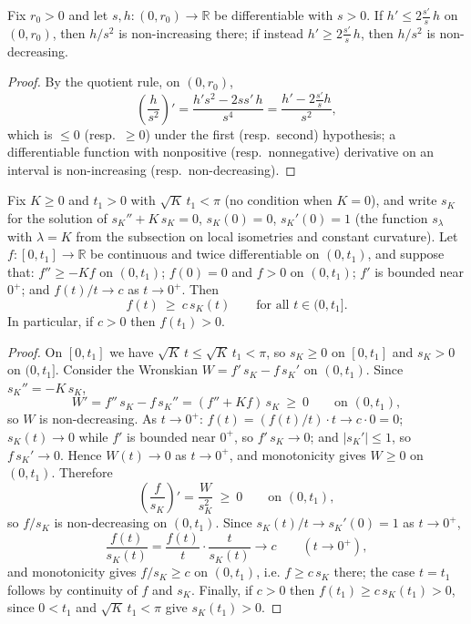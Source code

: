 \begin{lemma}
\label{lem:ratio-monotone}




Fix $r_0>0$ and let $s,h\colon(0,r_0)\to\mathbb R$ be differentiable
with $s>0$. If $h'\le 2\frac{s'}{s}\,h$ on $(0,r_0)$, then $h/s^2$
is non-increasing there; if instead $h'\ge2\frac{s'}{s}\,h$, then
$h/s^2$ is non-decreasing.
\end{lemma}

\begin{proof}
\sketch

By the quotient rule, on $(0,r_0)$,
$$\left(\frac{h}{s^2}\right)'
=\frac{h's^2-2ss'\,h}{s^4}
=\frac{h'-2\frac{s'}{s}h}{s^2},$$
which is $\le0$ (resp.\ $\ge0$) under the first (resp.\ second)
hypothesis; a differentiable function with nonpositive (resp.\
nonnegative) derivative on an interval is non-increasing (resp.\
non-decreasing).
\end{proof}

\begin{lemma}
\label{lem:scalar-sturm-comparison}




Fix $K\ge0$ and $t_1>0$ with $\sqrt K\,t_1<\pi$ (no condition when
$K=0$), and write $s_K$ for the solution of $s_K''+K\,s_K=0$,
$s_K(0)=0$, $s_K'(0)=1$ (the function $s_\lambda$ with $\lambda=K$
from the subsection on local isometries and constant curvature).
Let $f\colon[0,t_1]\to\mathbb{R}$ be continuous and twice
differentiable on $(0,t_1)$, and suppose that: $f''\ge -K f$ on
$(0,t_1)$; $f(0)=0$ and $f>0$ on $(0,t_1)$; $f'$ is bounded near
$0^+$; and $f(t)/t\to c$ as $t\to0^+$. Then
$$f(t)\ \ge\ c\,s_K(t)\qquad\text{for all }t\in(0,t_1].$$
In particular, if $c>0$ then $f(t_1)>0$.
\end{lemma}

\begin{proof}
\sketch

On $[0,t_1]$ we have $\sqrt K\,t\le\sqrt K\,t_1<\pi$, so $s_K\ge0$
on $[0,t_1]$ and $s_K>0$ on $(0,t_1]$. Consider the Wronskian
$W=f'\,s_K-f\,s_K'$ on $(0,t_1)$. Since $s_K''=-K\,s_K$,
$$W'=f''\,s_K-f\,s_K''=(f''+K f)\,s_K\ \ge\ 0\qquad
\text{on }(0,t_1),$$
so $W$ is non-decreasing. As $t\to0^+$: $f(t)=(f(t)/t)\cdot t\to
c\cdot0=0$; $s_K(t)\to0$ while $f'$ is bounded near $0^+$, so
$f'\,s_K\to0$; and $|s_K'|\le1$, so $f\,s_K'\to0$. Hence
$W(t)\to0$ as $t\to0^+$, and monotonicity gives $W\ge0$ on
$(0,t_1)$. Therefore
$$\left(\frac f{s_K}\right)'=\frac W{s_K^2}\ \ge\ 0
\qquad\text{on }(0,t_1),$$
so $f/s_K$ is non-decreasing on $(0,t_1)$. Since
$s_K(t)/t\to s_K'(0)=1$ as $t\to0^+$,
$$\frac{f(t)}{s_K(t)}=\frac{f(t)}{t}\cdot\frac{t}{s_K(t)}
\longrightarrow c\qquad(t\to0^+),$$
and monotonicity gives $f/s_K\ge c$ on $(0,t_1)$, i.e.
$f\ge c\,s_K$ there; the case $t=t_1$ follows by continuity of $f$
and $s_K$. Finally, if $c>0$ then
$f(t_1)\ge c\,s_K(t_1)>0$, since $0<t_1$ and $\sqrt K\,t_1<\pi$
give $s_K(t_1)>0$.
\end{proof}

